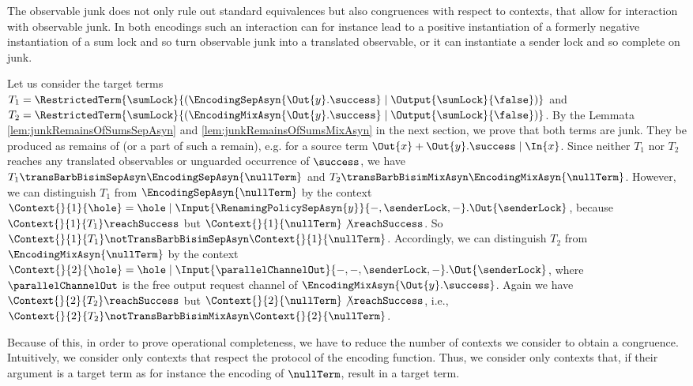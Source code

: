 \documentclass[]{llncs}
\begin{document}
The observable junk does not only rule out standard equivalences but also congruences with respect to contexts, that allow for interaction with observable junk. In both encodings such an interaction can for instance lead to a positive instantiation of a formerly negative instantiation of a sum lock and so turn observable junk into a translated observable, or it can instantiate a sender lock and so complete \simulations on junk.
\begin{example}
	Let us consider the target terms $ T_1 = \RestrictedTerm{\sumLock}{\left( \EncodingSepAsyn{\Out{y}.\success} \mid \Output{\sumLock}{\false} \right)} $ and $ T_2 = \RestrictedTerm{\sumLock}{\left( \EncodingMixAsyn{\Out{y}.\success} \mid \Output{\sumLock}{\false} \right)} $. By the Lemmata \ref{lem:junkRemainsOfSumsSepAsyn} and \ref{lem:junkRemainsOfSumsMixAsyn} in the next section, we prove that both terms are junk. They be produced as remains of \simulations (or a part of such a remain), e.g. for a source term $ \Out{x} + \Out{y}.\success \mid \In{x} $. Since neither $ T_1 $ nor $ T_2 $ reaches any translated observables or unguarded occurrence of $ \success $, we have $ T_1 \transBarbBisimSepAsyn \EncodingSepAsyn{\nullTerm} $ and $ T_2 \transBarbBisimMixAsyn \EncodingMixAsyn{\nullTerm} $. However, we can distinguish $ T_1 $ from $ \EncodingSepAsyn{\nullTerm} $ by the context $ \Context{}{1}{\hole} = \hole \mid \Input{\RenamingPolicySepAsyn{y}}{-, \senderLock, -}.\Out{\senderLock} $, because $ \Context{}{1}{T_1}\reachSuccess $ but $ \Context{}{1}{\nullTerm}\not\reachSuccess $. So $ \Context{}{1}{T_1} \notTransBarbBisimSepAsyn \Context{}{1}{\nullTerm} $. Accordingly, we can distinguish $ T_2 $ from $ \EncodingMixAsyn{\nullTerm} $ by the context $ \Context{}{2}{\hole} = \hole \mid \Input{\parallelChannelOut}{-, -, \senderLock, -}.\Out{\senderLock} $, where $ \parallelChannelOut $ is the free output request channel of $ \EncodingMixAsyn{\Out{y}.\success} $. Again we have $ \Context{}{2}{T_2}\reachSuccess $ but $ \Context{}{2}{\nullTerm}\not\reachSuccess $, i.e., $ \Context{}{2}{T_2} \notTransBarbBisimMixAsyn \Context{}{2}{\nullTerm} $.
\end{example}
Because of this, in order to prove operational completeness, we have to reduce the number of contexts we consider to obtain a congruence. Intuitively, we consider only contexts that respect the protocol of the encoding function. Thus, we consider only contexts that, if their argument is a target term as for instance the encoding of $ \nullTerm $, result in a target term.
\end{document}
